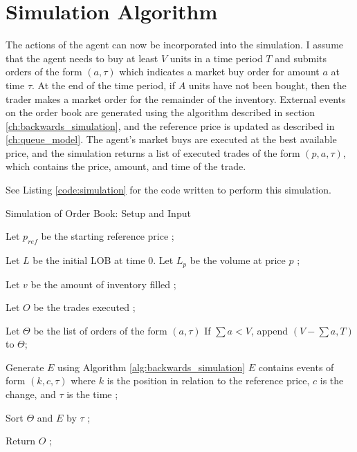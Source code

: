 \section{Simulation Algorithm} \label{ch:simulation_algorithm}

The actions of the agent can now be incorporated into the simulation. I assume that the agent needs to buy at least $V$ units in a time period $T$ and submits orders of the form $(a,\tau)$ which indicates a market buy order for amount $a$ at time $\tau$. At the end of the time period, if $A$ units have not been bought, then the trader makes a market order for the remainder of the inventory. External events on the order book are generated using the algorithm described in section \ref{ch:backwards_simulation}, and the reference price is updated as described in \ref{ch:queue_model}. The agent's market buys are executed at the best available price, and the simulation returns a list of executed trades of the form $(p,a,\tau)$, which contains the price, amount, and time of the trade.

See Listing \ref{code:simulation} for the code written to perform this simulation.

\begin{algorithm}[H]
\SetAlgoLined
\caption{Simulation of Order Book: Setup and Input}
Let $p_{ref}$ be the starting reference price ;

Let $L$ be the initial LOB at time $0$. Let $L_p$ be the volume at price $p$ ;

Let $v$ be the amount of inventory filled ;

Let $O$ be the trades executed ;

Let $\Theta$ be the list of orders of the form $(a,\tau)$ If $\sum{a} < V$, append $(V - \sum{a}, T)$ to $\Theta$;

Generate $E$ using Algorithm \ref{alg:backwards_simulation} $E$ contains events of form $(k,c,\tau)$ where $k$ is the position in relation to the reference price, $c$ is the change, and $\tau$ is the time ;

Sort $\Theta$ and $E$ by $\tau$ ;


Return $O$ ;
\end{algorithm}

